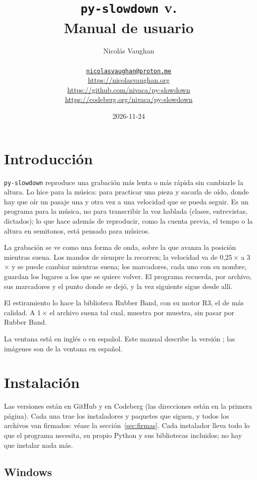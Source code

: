 \documentclass[12pt,
              article,
              oneside
              ]{memoir}
\title{\bfseries%
  \texttt{py-slowdown} v.\version{} \\
  Manual de usuario}
\author{%
  Nicolás Vaughan\\
  \begin{minipage}[t]{0.8\linewidth}
    \centering\small%
    \href{mailto:nicolasvaughan@proton.me}{\texttt{nicolasvaughan@proton.me}}\\
    \url{https://nicolasvaughan.org}\\
    \url{https://github.com/nivaca/py-slowdown}\\
    \url{https://codeberg.org/nivaca/py-slowdown}\\
  \end{minipage}}
\date{2026-11-24}
\begin{document}
\maketitle

\tableofcontents*

\section{Introducción}
\noindent
\texttt{py-slowdown} reproduce una grabación más lenta o más rápida sin
cambiarle la altura. Lo hice para la música: para practicar una pieza y
sacarla de oído, donde hay que oír un pasaje una y otra vez a una velocidad
que se pueda seguir. Es un programa para la música, no para transcribir la
voz hablada (clases, entrevistas, dictados); lo que hace además de
reproducir, como la cuenta previa, el tempo o la altura en semitonos, está
pensado para músicos.

%
La grabación se ve como una forma de onda, sobre la que avanza la posición
mientras suena. Los mandos de siempre la recorren; la velocidad va de
0,25\,× a 3\,× y se puede cambiar mientras suena; los marcadores, cada uno
con su nombre, guardan los lugares a los que se quiere volver. El programa
recuerda, por archivo, sus marcadores y el punto donde se dejó, y la vez
siguiente sigue desde allí.

%
El estiramiento lo hace la biblioteca Rubber Band, con su motor R3, el de
más calidad. A 1\,× el archivo suena tal
cual, muestra por muestra, sin pasar por Rubber Band.

%
La ventana está en inglés o en español. Este manual describe la versión
\version{}; las imágenes son de la ventana en español.

\section{Instalación}
\label{sec:instalacion}

%
Las versiones están en GitHub y en Codeberg (las direcciones están en la
primera página). Cada una trae los instaladores y paquetes que siguen, y
todos los archivos van firmados: véase la sección~\ref{sec:firmas}. Cada
instalador lleva todo lo que el programa necesita, su propio Python y sus
bibliotecas incluidos; no hay que instalar nada más.

\subsection{Windows}
\end{document}
